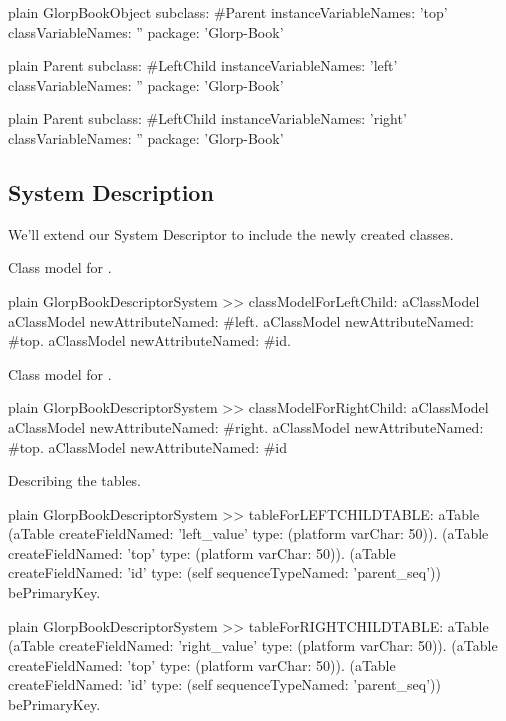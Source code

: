 \documentclass[10pt,twoside,english]{_support/latex/sbabook/sbabook}
\begin{document}
\begin{displaycode}{plain}
GlorpBookObject subclass: #Parent
	instanceVariableNames: 'top'
	classVariableNames: ''
	package: 'Glorp-Book'
\end{displaycode}

\begin{displaycode}{plain}
Parent subclass: #LeftChild
	instanceVariableNames: 'left'
	classVariableNames: ''
	package: 'Glorp-Book'
\end{displaycode}

\begin{displaycode}{plain}
Parent subclass: #LeftChild
	instanceVariableNames: 'right'
	classVariableNames: ''
	package: 'Glorp-Book'
\end{displaycode}
\subsection{System Description}
We'll extend our System Descriptor to include the newly created classes.

Class model for .

\begin{displaycode}{plain}
GlorpBookDescriptorSystem >> classModelForLeftChild: aClassModel
	aClassModel newAttributeNamed: #left.
	aClassModel newAttributeNamed: #top.
	aClassModel newAttributeNamed: #id.
\end{displaycode}

Class model for .

\begin{displaycode}{plain}
GlorpBookDescriptorSystem >> classModelForRightChild: aClassModel
	aClassModel newAttributeNamed: #right.
	aClassModel newAttributeNamed: #top.
	aClassModel newAttributeNamed: #id
\end{displaycode}

Describing the tables.

\begin{displaycode}{plain}
GlorpBookDescriptorSystem >> tableForLEFTCHILDTABLE: aTable
	(aTable createFieldNamed: 'left_value' type: (platform varChar: 50)).
	(aTable createFieldNamed: 'top' type: (platform varChar: 50)).
	(aTable createFieldNamed: 'id' type: (self sequenceTypeNamed: 'parent_seq'))
		bePrimaryKey.
\end{displaycode}

\begin{displaycode}{plain}
GlorpBookDescriptorSystem >> tableForRIGHTCHILDTABLE: aTable
	(aTable createFieldNamed: 'right_value' type: (platform varChar: 50)).
	(aTable createFieldNamed: 'top' type: (platform varChar: 50)).
	(aTable createFieldNamed: 'id' type: (self sequenceTypeNamed: 'parent_seq'))
		bePrimaryKey.
\end{displaycode}
\end{document}

